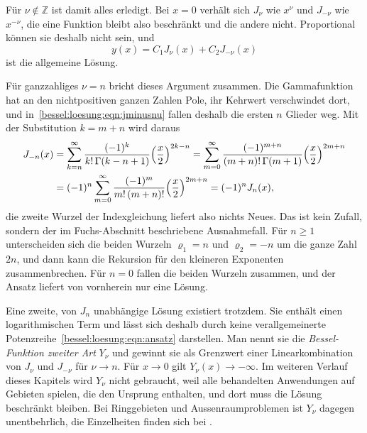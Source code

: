 Für $\nu\notin\mathbb{Z}$ ist damit alles erledigt.
Bei $x=0$ verhält sich $J_\nu$ wie $x^{\nu}$ und $J_{-\nu}$ wie $x^{-\nu}$, die eine Funktion bleibt also beschränkt und die andere nicht.
Proportional können sie deshalb nicht sein, und
\[
y(x)
=
C_1 J_\nu(x) + C_2 J_{-\nu}(x)
\]
ist die allgemeine Lösung.

Für ganzzahliges $\nu=n$ bricht dieses Argument zusammen.
Die Gammafunktion hat an den nichtpositiven ganzen Zahlen Pole, ihr Kehrwert verschwindet dort, und in~\eqref{bessel:loesung:eqn:jminusnu} fallen deshalb die ersten $n$ Glieder weg.
Mit der Substitution $k=m+n$ wird daraus
\begin{align*}
J_{-n}(x)
&=
\sum_{k=n}^\infty
\frac{(-1)^k}{k!\,\Gamma(k-n+1)}
\Bigl(\frac{x}{2}\Bigr)^{2k-n}
=
\sum_{m=0}^\infty
\frac{(-1)^{m+n}}{(m+n)!\,\Gamma(m+1)}
\Bigl(\frac{x}{2}\Bigr)^{2m+n}
\\
&=
(-1)^n
\sum_{m=0}^\infty
\frac{(-1)^m}{m!\,(m+n)!}
\Bigl(\frac{x}{2}\Bigr)^{2m+n}
=
(-1)^n J_n(x),
\end{align*}
die zweite Wurzel der Indexgleichung liefert also nichts Neues.
Das ist kein Zufall, sondern der im Fuchs-Abschnitt beschriebene Ausnahmefall.
Für $n\ge 1$ unterscheiden sich die beiden Wurzeln $\varrho_1=n$ und $\varrho_2=-n$ um die ganze Zahl $2n$, und dann kann die Rekursion für den kleineren Exponenten zusammenbrechen.
Für $n=0$ fallen die beiden Wurzeln zusammen, und der Ansatz liefert von vornherein nur eine Lösung.

Eine zweite, von $J_n$ unabhängige Lösung existiert trotzdem.
Sie enthält einen logarithmischen Term und lässt sich deshalb durch keine verallgemeinerte Potenzreihe~\eqref{bessel:loesung:eqn:ansatz} darstellen.
Man nennt sie die \emph{Bessel-Funktion zweiter Art} $Y_\nu$
%
und gewinnt sie als Grenzwert einer Linearkombination von $J_\nu$ und $J_{-\nu}$ für $\nu\to n$.
Für $x\to 0$ gilt $Y_\nu(x)\to-\infty$.
Im weiteren Verlauf dieses Kapitels wird $Y_\nu$ nicht gebraucht, weil alle behandelten Anwendungen auf Gebieten spielen, die den Ursprung enthalten, und dort muss die Lösung beschränkt bleiben.
Bei Ringgebieten und Aussenraumproblemen ist $Y_\nu$ dagegen unentbehrlich, die Einzelheiten finden sich bei \cite{bessel:watson}.